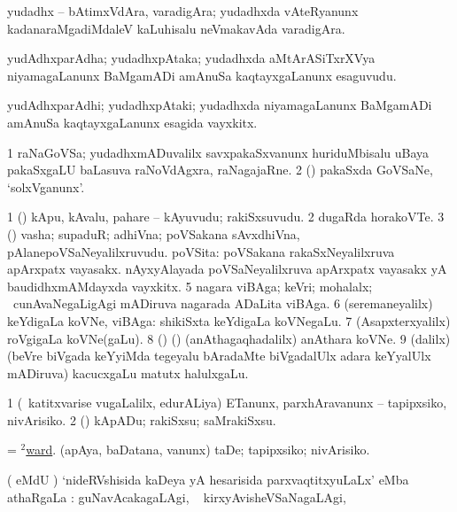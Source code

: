 \bentry
{} 
\gl{\nA}
\expl{}
\bmng
yudadhx -- bAtimxVdAra, varadigAra; yudadhxda vAteRyanunx kadanaraMgadiMdaleV kaLuhisalu neVmakavAda varadigAra. 
\emng
\eentry

\bentry
{} 
\gl{\nA}
\expl{}
\bmng
yudAdhxparAdha; yudadhxpAtaka; yudadhxda aMtArASiTxrXVya niyamagaLanunx BaMgamADi amAnuSa kaqtayxgaLanunx esaguvudu. 
\emng
\eentry

\bentry
{} 
\gl{\nA}
\expl{}
\bmng
yudAdhxparAdhi; yudadhxpAtaki; yudadhxda niyamagaLanunx BaMgamADi amAnuSa kaqtayxgaLanunx esagida vayxkitx. 
\emng
\eentry

\bentry
{} 
\gl{\nA}
\expl{}
\bmng
\bnum
\num{1} raNaGoVSa; yudadhxmADuvalilx savxpakaSxvanunx huriduMbisalu uBaya pakaSxgaLU baLasuva raNoVdAgxra, raNagajaRne. 
\num{2} (\rUpa) pakaSxda GoVSaNe, `solxVganunx'. 
\enum
\emng
\eentry

\bentry
{} 
\gl{\nA}
\expl{}
\bmng
\bnum
\num{1} (\pArxparx) kApu, kAvalu, pahare -- kAyuvudu; rakiSxsuvudu. 
\num{2} dugaRda horakoVTe. 
\num{3} (\pArxparx) vasha; supaduR; adhiVna; poVSakana sAvxdhiVna, pAlanepoVSaNeyalilxruvudu. 
 poVSita: 
\banum
{} poVSakana rakaSxNeyalilxruva apArxpatx vayasakx. 
 nAyxyAlayada poVSaNeyalilxruva apArxpatx vayasakx yA baudidhxmAMdayxda vayxkitx. 
\eanum
\numie
\num{5} nagara viBAga; keVri; mohalalx; \kanmu\ cunAvaNegaLigAgi mADiruva nagarada ADaLita viBAga. 
\num{6} (seremaneyalilx) keYdigaLa koVNe, viBAga:  shikiSxta keYdigaLa koVNegaLu. 
\num{7} (Asapxterxyalilx) roVgigaLa koVNe(gaLu). 
\num{8} (\ca) (\birx) (anAthagaqhadalilx) anAthara koVNe. 
\num{9} (\bava dalilx) (beVre biVgada keYyiMda tegeyalu bAradaMte biVgadalUlx adara keYyalUlx mADiruva) kacucxgaLu matutx halulxgaLu. 
\enum
\emng
\eentry

\bentry
{} 
\gl{\sakirx}
\expl{}
\bmng
\bnum
\num{1} (\kanmu\ katitxvarise \mo vugaLalilx, edurALiya) ETanunx, parxhAravanunx -- tapipxsiko, nivArisiko. 
\num{2} (\pArxparx) kApADu; rakiSxsu; saMrakiSxsu. 
\enum
\emng

\noindent 
\gl{\pagu}
\expl{}
\bmng
{} 
\banum
{} = \hyperlink{ward(2)}{$^2$ward}. 
 (apAya, baDatana, \mo vanunx) taDe; tapipxsiko; nivArisiko. 
\eanum
\emng
\eentry

\bentry
{} 
\gl{\uparx}
\expl{}
\bmng
( eMdU \parx) `nideRVshisida kaDeya yA hesarisida parxvaqtitxyuLaLx' eMba athaRgaLa \uparx : 
\banum
{} guNavAcakagaLAgi, \udA\  
 kirxyAvisheVSaNagaLAgi, \udA\  
\eanum
\emng
\eentry

